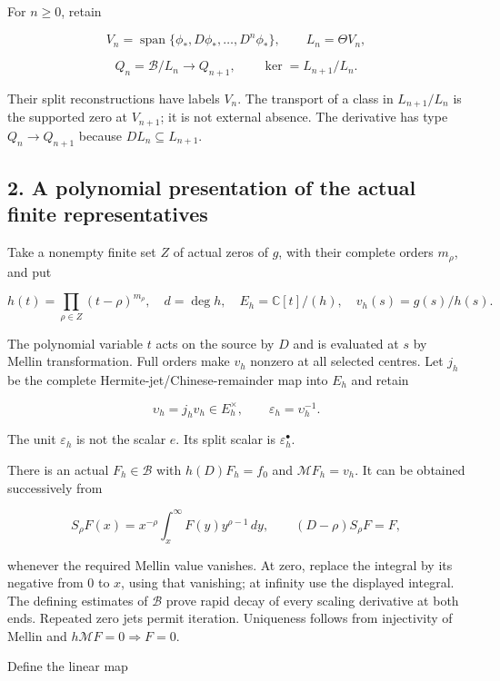 \documentclass[
]{article}
\begin{document}
For \(n\ge0\), retain

\[V_n=\operatorname{span}\{\phi_*,D\phi_*,\ldots,D^n\phi_*\},\qquad L_n=\Theta V_n,\]

\[Q_n=\mathscr B/L_n\longrightarrow Q_{n+1},\qquad\ker= L_{n+1}/L_n.\tag{1.3}\]

Their split reconstructions have labels \(V_n\). The transport of a
class in \(L_{n+1}/L_n\) is the supported zero at \(V_{n+1}\); it is not
external absence. The derivative has type \(Q_n\to Q_{n+1}\) because
\(DL_n\subseteq L_{n+1}\).

\subsection{2. A polynomial presentation of the actual finite
representatives}\label{a-polynomial-presentation-of-the-actual-finite-representatives}

Take a nonempty finite set \(Z\) of actual zeros of \(g\), with their
complete orders \(m_\rho\), and put

\[h(t)=\prod_{\rho\in Z}(t-\rho)^{m_\rho},\quad d=\deg h,\quad E_h=\mathbb C[t]/(h),\quad v_h(s)=g(s)/h(s).\tag{2.1}\]

The polynomial variable \(t\) acts on the source by \(D\) and is
evaluated at \(s\) by Mellin transformation. Full orders make \(v_h\)
nonzero at all selected centres. Let \(j_h\) be the complete
Hermite-jet/Chinese-remainder map into \(E_h\) and retain

\[\upsilon_h=j_hv_h\in E_h^\times,\qquad\varepsilon_h=\upsilon_h^{-1}.\tag{2.2}\]

The unit \(\varepsilon_h\) is not the scalar \(e\). Its split scalar is
\(\varepsilon_h^\bullet\).

There is an actual \(F_h\in\mathscr B\) with \(h(D)F_h=f_0\) and
\(\mathcal MF_h=v_h\). It can be obtained successively from

\[S_\rho F(x)=x^{-\rho}\int_x^\infty F(y)y^{\rho-1}\,dy,\qquad(D-\rho)S_\rho F=F,\tag{2.3}\]

whenever the required Mellin value vanishes. At zero, replace the
integral by its negative from \(0\) to \(x\), using that vanishing; at
infinity use the displayed integral. The defining estimates of
\(\mathscr B\) prove rapid decay of every scaling derivative at both
ends. Repeated zero jets permit iteration. Uniqueness follows from
injectivity of Mellin and \(h\mathcal MF=0\Rightarrow F=0\).

Define the linear map
\end{document}
